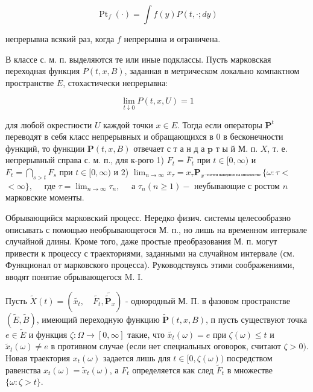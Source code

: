 \documentclass[10pt]{article}
\begin{document}
\[

\operatorname{Pt}_{f}(\cdot)=\int f(y) P(t, \cdot ; d y)

\]



непрерывна всякий раз, когда $f$ непрерывна и ограничена.



В классе с. м. п. выделяются те или иные подклассы. Пусть марковская переходная функция $P(t, x, B)$, заданная в метрическом локально компактном пространстве $E$, стохастически непрерывна:



\[

\lim _{t \downarrow 0} P(t, x, U)=1

\]



для любой окрестности $U$ каждой точки $x \in E$. Тогда если операторы $\boldsymbol{P}^{t}$ переводят в себя класс непрерывных и обращающихся в 0 в бесконечности функций, то функции $\boldsymbol{P}(t, x, B)$ отвечает с т а н д а $\mathbf{p}$ т ы й М. п. $X$, т. е. непрерывный справа с. м. п., для к-рого 1) $F_{t}=\bar{F}_{t}$ при $t \in[0, \infty)$ и $F_{t}=\bigcap_{s>t} F_{s}$ при $t \in[0, \infty)$ и 2) $\lim _{n \rightarrow \infty} x_{\tau}=x_{\tau} \mathbf{P}_{x^{-п о ч т и ~ н а в е р н о е ~ н а ~ м н о ж е с т в е ~}}\{\omega: \tau<$ $<\infty\}, \quad$ где $\tau=\lim _{n \rightarrow \infty} \tau_{n}, \quad$ а $\tau_{n}(n \geqslant 1)-$ неубывающие с ростом $n$ марковские моменты.



Обрывающийся марковский процесс. Нередко физич. системы целесообразно описывать с помощью необрывающегося М. п., но лишь на временном интервале случайной длины. Кроме того, даже простые преобразования М. п. могут привести к процессу с траекториями, заданными на случайном интервале (см. Функционал от марковского процесса). Руководствуясь этими соображениями, вводят понятие обрывающегося M. I.



Пусть $\tilde{X}(t)=\left(\tilde{x_{t}}, \quad \tilde{F_{t}}, \tilde{\tilde{\mathbf{P}}_{x}}\right)$ - однородный М. П. в фазовом пространстве $(\tilde{E}, \tilde{B})$, имеющий переходную функцию $\tilde{\boldsymbol{P}}(t, x, B)$, п пусть существуют точка $e \in \tilde{E}$ и функция $\zeta: \Omega \rightarrow[0, \infty]$ такие, что $\tilde{x_{t}}(\omega)=e$ при $\zeta(\omega) \leqslant t$ и $\tilde{x}_{t}(\omega) \neq e$ в противном случае (если нет специальных оговорок, считают $\zeta>0)$. Новая траектория $x_{t}(\omega)$ задается лишь для $t \in[0, \zeta(\omega))$ посредством равенства $x_{t}(\omega)=\tilde{x}_{t}(\omega)$, а $F_{t}$ определяется как след $\tilde{F}_{t}$ в множестве $\{\omega: \zeta>t\}$.
\end{document}
